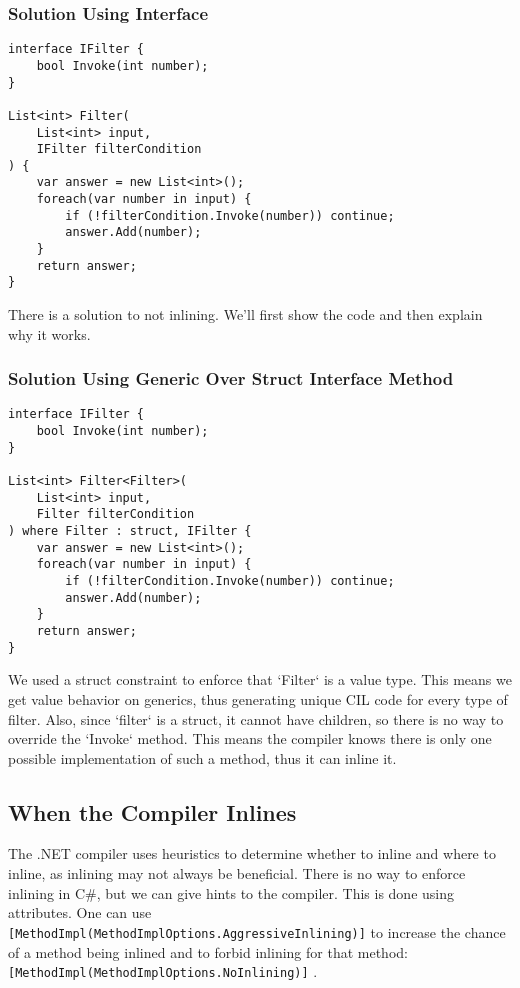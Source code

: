 \subsubsection{Solution Using Interface}
\begin{lstlisting}
interface IFilter {
    bool Invoke(int number);
}

List<int> Filter(
    List<int> input, 
    IFilter filterCondition
) {
    var answer = new List<int>();
    foreach(var number in input) {
        if (!filterCondition.Invoke(number)) continue;
        answer.Add(number);
    }
    return answer;
}
\end{lstlisting}

There is a solution to not inlining. We'll first show the code and then explain why it works.

\subsubsection{Solution Using Generic Over Struct Interface Method}
\begin{lstlisting}
interface IFilter {
    bool Invoke(int number);
}

List<int> Filter<Filter>(
    List<int> input, 
    Filter filterCondition
) where Filter : struct, IFilter {
    var answer = new List<int>();
    foreach(var number in input) {
        if (!filterCondition.Invoke(number)) continue;
        answer.Add(number);
    }
    return answer;
}
\end{lstlisting}

We used a struct constraint to enforce that `Filter` is a value type. This means we get value behavior on generics, thus generating unique CIL code for every type of filter. Also, since `filter` is a struct, it cannot have children, so there is no way to override the `Invoke` method. This means the compiler knows there is only one possible implementation of such a method, thus it can inline it.

\subsection{When the Compiler Inlines}
The .NET compiler uses heuristics to determine whether to inline and where to inline, as inlining may not always be beneficial. There is no way to enforce inlining in C\#, but we can give hints to the compiler. This is done using attributes. One can use \texttt{[MethodImpl(MethodImplOptions.AggressiveInlining)]} to increase the chance of a method being inlined and to forbid inlining for that method:
\texttt{[MethodImpl(MethodImplOptions.NoInlining)]} .

